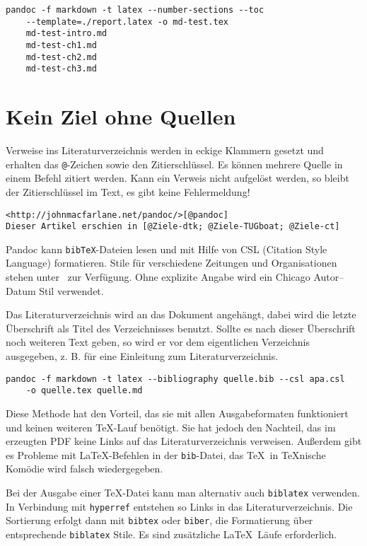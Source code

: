 \documentclass[11pt,ngerman,a4paper]{article}
\begin{document}
\begin{verbatim}
pandoc -f markdown -t latex --number-sections --toc 
    --template=./report.latex -o md-test.tex 
    md-test-intro.md 
    md-test-ch1.md 
    md-test-ch2.md 
    md-test-ch3.md
\end{verbatim}

\section{Kein Ziel ohne Quellen}

Verweise ins Literaturverzeichnis werden in eckige Klammern gesetzt und
erhalten das \texttt{@}-Zeichen sowie den Zitierschlüssel. Es können
mehrere Quelle in einem Befehl zitiert werden. Kann ein Verweis nicht
aufgelöst werden, so bleibt der Zitierschlüssel im Text, es gibt keine
Fehlermeldung!

\begin{verbatim}
<http://johnmacfarlane.net/pandoc/>[@pandoc]
Dieser Artikel erschien in [@Ziele-dtk; @Ziele-TUGboat; @Ziele-ct]
\end{verbatim}

Pandoc kann \texttt{bibTeX}-Dateien lesen und mit Hilfe von CSL
(Citation Style Language) formatieren. Stile für verschiedene Zeitungen
und Organisationen stehen unter~\autocite{csl} zur Verfügung. Ohne
explizite Angabe wird ein Chicago Autor--Datum Stil verwendet.

Das Literaturverzeichnis wird an das Dokument angehängt, dabei wird die
letzte Überschrift als Titel des Verzeichnisses benutzt. Sollte es nach
dieser Überschrift noch weiteren Text geben, so wird er vor dem
eigentlichen Verzeichnis ausgegeben, z. B. für eine Einleitung zum
Literaturverzeichnis.

\begin{verbatim}
pandoc -f markdown -t latex --bibliography quelle.bib --csl apa.csl 
    -o quelle.tex quelle.md
\end{verbatim}

Diese Methode hat den Vorteil, das sie mit allen Ausgabeformaten
funktioniert und keinen weiteren TeX-Lauf benötigt. Sie hat jedoch den
Nachteil, das im erzeugten PDF keine Links auf das Literaturverzeichnis
verweisen. Außerdem gibt es Probleme mit LaTeX-Befehlen in der
\texttt{bib}-Datei, das TeX~in TeXnische Komödie wird falsch
wiedergegeben.

Bei der Ausgabe einer TeX-Datei kann man alternativ auch
\texttt{biblatex} verwenden. In Verbindung mit \texttt{hyperref}
entstehen so Links in das Literaturverzeichnis. Die Sortierung erfolgt
dann mit \texttt{bibtex} oder \texttt{biber}, die Formatierung über
entsprechende \texttt{biblatex} Stile. Es sind zusätzliche LaTeX~Läufe
erforderlich.
\end{document}
